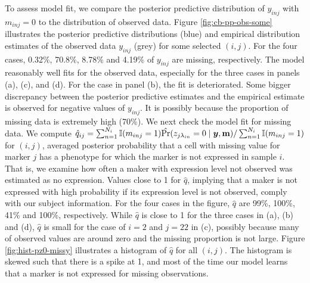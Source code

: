 \documentclass[12pt,]{article}
\def\Prob{\text{Pr}}
\newcommand{\by}{\mbox{\boldmath $y$}}
\newcommand{\ech}{\color{Black}\rm}
\newcommand{\hh}{\color{Mahogany}\it}
\begin{document}
To assess model fit, we compare the posterior predictive distribution of
$y_{inj}$ with $m_{inj}=0$ to the distribution of observed data. Figure
\ref{fig:cb-pp-obs-some} illustrates the posterior predictive distributions
(blue) and empirical distribution estimates of the observed data $y_{inj}$
(grey) for some selected $(i,j)$.  For the four cases, 0.32\%, 70.8\%, 8.78\%
and 4.19\% of $y_{inj}$ are missing, respectively.   The model reasonably well
fits for the observed data, especially for the three cases in panels (a), (c),
and (d).  For the case in panel (b), the fit is deteriorated. Some bigger
discrepancy between the posterior predictive estimates and the empirical
estimate is observed for negative values of $y_{inj}$.  It is  possibly because
the proportion of missing data is extremely high (70\%).  
We next check the model fit for missing data.  We compute $\hat{q}_{ij}=
\sum_{n=1}^{N_i}\mathbb{I}(m_{inj}=1)\hat{\Prob}(z_{j \lambda_{in}}=0 \mid \by,
{\bf m})/\sum_{n=1}^{N_i}\mathbb{I}  (m_{inj}=1)$
for $(i,j)$, averaged posterior probability that a cell
with missing value for marker $j$ has a phenotype for which the marker is not
expressed in sample $i$.  That is, we examine how often a maker with expression
level not observed was estimated as no expression. Values close to 1 for
$\hat{q}$, implying that a maker is not expressed with high probability if its
expression level is not observed, comply with our subject information.  For the
four cases in the figure, $\hat{q}$ are 99\%, 100\%, 41\% and 100\%,
respectively. While $\hat{q}$ is close to 1 for the three cases in (a), (b) and
(d), $\hat{q}$ is small for the case of $i=2$ and $j=22$ in (c), possibly
because many of observed values are around zero and the missing proportion is
not large. %
%
%
Figure \ref{fig:hist-pz0-missy} illustrates a histogram of $\hat{q}$ for all
$(i,j)$. The histogram is skewed such that there is a spike at 1, and most of
the time our model learns that a marker is not expressed for missing
observations.
\end{document}
